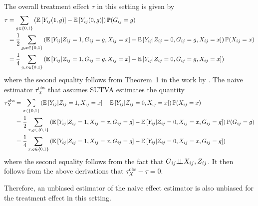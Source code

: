 \documentclass[10pt]{article}
\begin{document}
The overall treatment effect $\tau$ in this setting is given by
\begin{align*}
\tau %
&= \sum_{g\in\{0,1\}} \left(\E\left[Y_{ij}(1,g)\right] - \E\left[Y_{ij}(0,g)\right]\right)\P(G_{ij}=g) \\
&= \frac{1}{2}\sum_{g,x\in\{0,1\}} \left(\E\left[Y_{ij}|Z_{ij}=1,G_{ij}=g,X_{ij}=x\right] - \E\left[Y_{ij}|Z_{ij}=0,G_{ij}=g,X_{ij}=x\right]\right)\P(X_{ij}=x) \\
&= \frac{1}{4}\sum_{g,x\in\{0,1\}} \left(\E\left[Y_{ij}|Z_{ij}=1,G_{ij}=g,X_{ij}=x\right] - \E\left[Y_{ij}|Z_{ij}=0,G_{ij}=g,X_{ij}=x\right]\right)
\end{align*}
where the second equality follows from Theorem~1 in the work by \textcite{Forastiere:2021}. The naive estimator $\tau_{X}^\text{obs}$ that assumes SUTVA estimates the quantity
\begin{align*}
\tau_{X}^\text{obs} &=
\sum_{x\in\{0,1\}}\left(\mathbb{E}\left[Y_{ij}|Z_{ij}=1,X_{ij}=x\right] - \mathbb{E}\left[Y_{ij}|Z_{ij}=0,X_{ij}=x\right]\right)\mathbb{P}(X_{ij}=x) \\
&= \frac{1}{2}\sum_{x,g\in\{0,1\}}\left(\mathbb{E}\left[Y_{ij}|Z_{ij}=1,X_{ij}=x,G_{ij}=g\right] - \mathbb{E}\left[Y_{ij}|Z_{ij}=0,X_{ij}=x,G_{ij}=g\right]\right)\mathbb{P}(G_{ij}=g) \\
&= \frac{1}{4}\sum_{x,g\in\{0,1\}}\left(\mathbb{E}\left[Y_{ij}|Z_{ij}=1,X_{ij}=x,G_{ij}=g\right] - \mathbb{E}\left[Y_{ij}|Z_{ij}=0,X_{ij}=x,G_{ij}=g\right]\right)
\end{align*}
where the second equality follows from the fact that $G_{ij}{\perp\!\!\!\perp} X_{ij}, Z_{ij}$. It then follows from the above derivations that $\tau_{X}^\text{obs}-\tau = 0$.
\iffalse
and Assumptions~1 and 3 that
\begin{align*}
&\tau_{X}^\text{obs}-\tau \\
&= \tau_{X}^\text{obs} - \frac{1}{2}\left(\mu(1,0) + \mu(1,1) - \mu(0,0) - \mu(0,1)\right) \\
&= \tau_{X}^\text{obs} - \frac{1}{2}\sum_{x\in\{0,1\}}\left(\E\left[Y_{ij}|Z_{ij}=1,X_{ij}=x,G_{ij}=0\right] + \E\left[Y_{ij}|Z_{ij}=1,X_{ij}=x,G_{ij}=1\right]\right. \\
&\quad - \left.\E\left[Y_{ij}|Z_{ij}=0,X_{ij}=x,G_{ij}=0\right] - \E\left[Y_{ij}|Z_{ij}=0,X_{ij}=x,G_{ij}=1\right]\right)\P(X_{ij}=x) \\
&= 0 \;.
\end{align*}
\fi
Therefore, an unbiased estimator of the naive effect estimator is also unbiased for the treatment effect in this setting.
\end{document}

